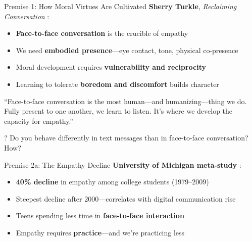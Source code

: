 \documentclass[aspectratio=169]{beamer}
\begin{document}
\begin{frame}{Premise 1: How Moral Virtues Are Cultivated}
\textbf{Sherry Turkle}, \textit{Reclaiming Conversation} \parencite{turkle_reclaiming}:

\begin{itemize}
    \item \textbf{Face-to-face conversation} is the crucible of empathy
    \item We need \textbf{embodied presence}---eye contact, tone, physical co-presence
    \item Moral development requires \textbf{vulnerability and reciprocity}
    \item Learning to tolerate \textbf{boredom and discomfort} builds character
\end{itemize}

\vspace{0.3cm}
\begin{quotebox}
``Face-to-face conversation is the most human---and humanizing---thing we do. Fully present to one another, we learn to listen. It's where we develop the capacity for empathy.''
\end{quotebox}

\begin{alertblock}{?}
Do you behave differently in text messages than in face-to-face conversation? How?
\end{alertblock}
\end{frame}

\begin{frame}{Premise 2a: The Empathy Decline}
\textbf{University of Michigan meta-study} \parencite{konrath_empathy_decline}:

\begin{itemize}
    \item \textbf{40\% decline} in empathy among college students (1979--2009)
    \item Steepest decline after 2000---correlates with digital communication rise
    \item Teens spending less time in \textbf{face-to-face interaction}
    \item Empathy requires \textbf{practice}---and we're practicing less
\end{itemize}

\vspace{0.3cm}
\begin{center}
\end{center}
\end{frame}
\end{document}
